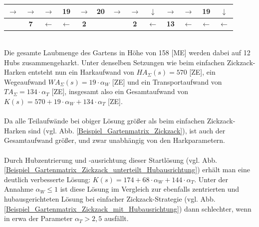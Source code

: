 \begin{center}
\begin{minipage}{\textwidth}
\begin{table}[H]
\begin{scriptsize}
\begin{tabular}{|>{}c|>{}c|>{}c|>{}c||>{}c|>{}c|>{}c|>{}c|>{}c||>{}c|>{}c|>{}c|>{}c|}
\hline
\cellcolor{red!15!white}$\rightarrow$&\cellcolor{red!15!white}$\rightarrow$&\cellcolor{red!15!white}$\rightarrow$&\cellcolor{red!15!white}\bf{19}&
\cellcolor{blue!15!white}$\rightarrow$&\cellcolor{blue!15!white}\bf{20}&\cellcolor{red!15!white}$\rightarrow$&\cellcolor{red!15!white}$\rightarrow$&\cellcolor{red!15!white}$\downarrow$ &\cellcolor{green!15!white}$\rightarrow$&\cellcolor{green!15!white}$\rightarrow$&\cellcolor{green!15!white}\bf{19}&\cellcolor{yellow!15!white}$\downarrow$\\
\hline
\cellcolor{gray!50!white} &\cellcolor{yellow!15!white}\bf{7}&\cellcolor{yellow!15!white}$\leftarrow$&\cellcolor{yellow!15!white}$\leftarrow$&
\cellcolor{green!15!white}\bf{2}&\cellcolor{gray!50!white} &\cellcolor{gray!50!white} &\cellcolor{red!15!white}\bf{2}&\cellcolor{red!15!white}$\leftarrow$& \cellcolor{yellow!15!white}\bf{13}&\cellcolor{yellow!15!white}$\leftarrow$&\cellcolor{yellow!15!white}$\leftarrow$&\cellcolor{yellow!15!white}$\leftarrow$ \\
\hline
\end{tabular}
\label{Beispiel_Gartenmatrix_Zickzack_unterteilt}
\end{scriptsize} 
\end{table}
\renewcommand{\arraystretch}{1}
\end{minipage}
\end{center}

\phantom \\
\noindent Die gesamte Laubmenge des Gartens in Höhe von 158 [ME] werden dabei auf 12 Hubs zusammengeharkt. Unter denselben Setzungen wie beim einfachen Zickzack-Harken entsteht nun ein Harkaufwand von $HA_{\Sigma}(s)=570$ [ZE], ein Wegeaufwand $WA_{\Sigma}(s) = 19 \cdot \alpha_W$ [ZE] und ein Transportaufwand von $TA_{\Sigma} = 134\cdot \alpha_T$ [ZE], insgesamt also ein Gesamtaufwand von $K(s) = 570 + 19 \cdot \alpha_W + 134\cdot \alpha_T$ [ZE]. \\ 
\\
Da alle Teilaufwände bei obiger Lösung größer als beim einfachen Zickzack-Harken sind (vgl. Abb.  \ref{Beispiel_Gartenmatrix_Zickzack}), ist auch der Gesamtaufwand größer, und zwar unabhängig von den Harkparametern.\\
\\
\noindent Durch Hubzentrierung und -ausrichtung dieser Startlösung (vgl. Abb. \ref{Beispiel_Gartenmatrix_Zickzack_unterteilt_Hubausrichtung}) erhält man eine deutlich verbesserte Lösung: 
$K(s) = 174 + 68 \cdot \alpha_W + 144\cdot \alpha_T$. Unter der Annahme $\alpha_W \leq 1$ ist diese Lösung im Vergleich zur ebenfalls zentrierten und hubausgerichteten Lösung bei einfacher Zickzack-Strategie (vgl. Abb. \ref{Beispiel_Gartenmatrix_Zickzack_mit_Hubausrichtung}) dann schlechter, wenn in erwa der Parameter $\alpha_T > 2,5$ ausfällt. 

